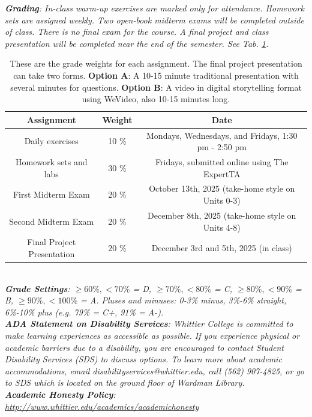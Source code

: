 \documentclass[10pt]{article}
\begin{document}
\textit{\textbf{Grading}: In-class warm-up exercises are marked only for attendance.  Homework sets are assigned weekly.  Two open-book midterm exams will be completed outside of class.  There is no final exam for the course.  A final project and class presentation will be completed near the end of the semester.  See Tab. \ref{tab:grading}.}
\begin{table}
\centering
\begin{tabular}{| c | c | c |}
\hline
\textbf{Assignment} & \textbf{Weight} & \textbf{Date} \\ \hline
Daily exercises & 10 \% & Mondays, Wednesdays, and Fridays, 1:30 pm - 2:50 pm \\ \hline
Homework sets and labs & 30 \% & Fridays, submitted online using The ExpertTA \\ \hline
First Midterm Exam & 20 \% & October 13th, 2025 (take-home style on Units 0-3) \\ \hline
Second Midterm Exam & 20 \% & December 8th, 2025 (take-home style on Units 4-8) \\ \hline
Final Project Presentation & 20 \% & December 3rd and 5th, 2025 (in class) \\ \hline
\end{tabular}
\caption{\label{tab:grading} These are the grade weights for each assignment. The final project presentation can take two forms.  \textbf{Option A}: A 10-15 minute traditional presentation with several minutes for questions.  \textbf{Option B}: A video in digital storytelling format using WeVideo, also 10-15 minutes long.}
\end{table} \\
\textit{\textbf{Grade Settings}: $\geq 60\%, <70\%$ = D, $\geq 70\%, <80\%$ = C, $\geq 80\%, <90\%$ = B, $\geq 90\%, <100\%$ = A. Pluses and minuses: 0-3\% minus, 3\%-6\% straight, 6\%-10\% plus (e.g. 79\% = C+, 91\% = A-).} \\
\textit{\textbf{ADA Statement on Disability Services}: Whittier College is committed to make learning experiences as accessible as possible. If you experience physical or academic barriers due to a disability, you are encouraged to contact Student Disability Services (SDS) to discuss options. To learn more about academic accommodations, email disabilityservices@whittier.edu, call (562) 907-4825, or go to SDS which is located on the ground floor of Wardman Library.} \\
\textit{\textbf{Academic Honesty Policy}: \url{http://www.whittier.edu/academics/academichonesty}} \\
\end{document}
